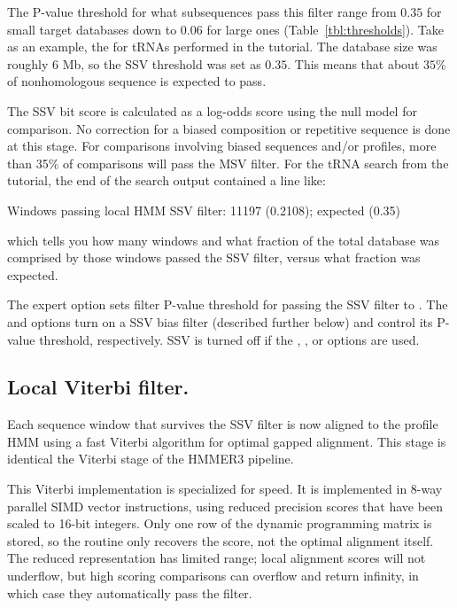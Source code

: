 The P-value threshold for what subsequences pass this filter range
from $0.35$ for small target databases down to $0.06$ for large ones
(Table~\ref{tbl:thresholds}). Take as an example, the  for tRNAs
performed in the tutorial. The database size was roughly 6 Mb, so the
SSV threshold was set as $0.35$. This means that about $35\%$ of
nonhomologous sequence is expected to pass. 

The SSV bit score is calculated as a log-odds score using the null
model for comparison. No correction for a biased composition or
repetitive sequence is done at this stage. For comparisons involving
biased sequences and/or profiles, more than 35\% of comparisons will
pass the MSV filter. For the tRNA search from the tutorial, the end of
the search output contained a line like:

\begin{sreoutput}
Windows   passing  local HMM SSV           filter:           11197  (0.2108); expected (0.35)
\end{sreoutput}

which tells you how many windows and what fraction of the total
database was comprised by those windows passed the 
SSV filter, versus what fraction was expected.

The  expert option sets filter P-value threshold for
passing the SSV filter to . The  and
 options turn on a SSV bias filter (described further
below) and control its P-value threshold, respectively. SSV is turned
off if the , , or  options
are used.

\subsection{Local Viterbi filter.}
Each sequence window that survives the SSV filter is now aligned to
the profile HMM using a fast Viterbi algorithm for optimal gapped
alignment. This stage is identical the Viterbi stage of the HMMER3
pipeline. 

This Viterbi implementation is specialized for speed.  It is
implemented in 8-way parallel SIMD vector instructions, using reduced
precision scores that have been scaled to 16-bit integers. Only one
row of the dynamic programming matrix is stored, so the routine only
recovers the score, not the optimal alignment itself. The reduced
representation has limited range; local alignment scores will not
underflow, but high scoring comparisons can overflow and return
infinity, in which case they automatically pass the filter.

